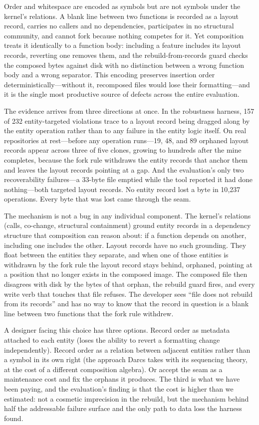 Order and whitespace are encoded as symbols but are not symbols under the
kernel's relations. A blank line between two functions is recorded as a layout
record, carries no callers and no dependencies, participates in no structural
community, and cannot fork because nothing competes for it. Yet composition
treats it identically to a function body: including a feature includes its
layout records, reverting one removes them, and the rebuild-from-records
guard checks the composed bytes against disk with no distinction between a
wrong function body and a wrong separator. This encoding preserves insertion
order deterministically---without it, recomposed files would lose their
formatting---and it is the single most productive source of defects across
the entire evaluation.

The evidence arrives from three directions at once. In the robustness harness,
157 of 232 entity-targeted violations trace to a layout record being dragged
along by the entity operation rather than to any failure in the entity logic
itself. On real repositories at rest---before any operation runs---19, 48, and
89 orphaned layout records appear across three of five clones, growing to
hundreds after the mine completes, because the fork rule withdraws the entity
records that anchor them and leaves the layout records pointing at a gap.
And the evaluation's only two recoverability failures---a 33-byte file emptied
while the tool reported it had done nothing---both targeted layout records. No
entity record lost a byte in 10{,}237 operations. Every byte that was lost came
through the seam.

The mechanism is not a bug in any individual component. The kernel's relations
(calls, co-change, structural containment) ground entity records in a
dependency structure that composition can reason about: if a function depends
on another, including one includes the other. Layout records have no such
grounding. They float between the entities they separate, and when one of those
entities is withdrawn by the fork rule the layout record stays behind, orphaned,
pointing at a position that no longer exists in the composed image. The composed
file then disagrees with disk by the bytes of that orphan, the rebuild guard
fires, and every write verb that touches that file refuses. The developer sees
``file does not rebuild from its records'' and has no way to know that the record
in question is a blank line between two functions that the fork rule withdrew.

A designer facing this choice has three options. Record order as metadata
attached to each entity (loses the ability to revert a formatting change
independently). Record order as a relation between adjacent entities rather
than a symbol in its own right (the approach Darcs takes with its sequencing
theory, at the cost of a different composition algebra). Or accept the seam as a
maintenance cost and fix the orphans it produces. The third is what we have been
paying, and the evaluation's finding is that the cost is higher than we
estimated: not a cosmetic imprecision in the rebuild, but the mechanism behind
half the addressable failure surface and the only path to data loss the harness
found.

